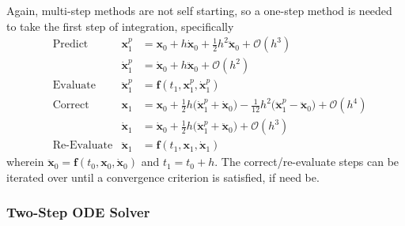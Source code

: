 Again, multi-step methods are not self starting, so a one-step method is needed to take the first step of integration, specifically
\begin{subequations}
    \label{pairedStartUp}
    \begin{align}
    \mbox{} & \text{Predict} & 
    \mathbf{x}_1^p & = \mathbf{x}_0 + h \dot{\mathbf{x}}_0 +
    \tfrac{1}{2} h^2 \ddot{\mathbf{x}}_0 + \mathcal{O} (h^3) 
    \label{startupDisplacementPredictor} \\
    \mbox{} & &
    \dot{\mathbf{x}}^p_1 & = \dot{\mathbf{x}}_0 + h \ddot{\mathbf{x}}_0 + 
    \mathcal{O} (h^2) 
    \label{startUpVelocityPredictor} \\
    \mbox{} & \text{Evaluate} &
    \ddot{\mathbf{x}}^p_1 & = \mathbf{f} (t_1, \mathbf{x}^p_1, \dot{\mathbf{x}}^p_1)
    \label{startUpEvaluate} \\
    \mbox{} & \text{Correct} &
    \mathbf{x}_1 & = \mathbf{x}_0 + \tfrac{1}{2} h 
    \bigl( \dot{\mathbf{x}}^p_1 + \dot{\mathbf{x}}_0 \bigr) -
    \tfrac{1}{12} h^2 \bigl( \ddot{\mathbf{x}}^p_1 - 
    \ddot{\mathbf{x}}_0 \bigr) + \mathcal{O} (h^4) 
    \label{startupDisplacementCorrector} \\
    \mbox{} & &
    \dot{\mathbf{x}}_1 & = \dot{\mathbf{x}}_0 + \tfrac{1}{2} h 
    \bigl( \ddot{\mathbf{x}}_1^p + \ddot{\mathbf{x}}_0 \bigr) + 
    \mathcal{O} (h^3)
    \label{startUpVelocityCorrector} \\
    \mbox{} & \text{Re-Evaluate} &
    \ddot{\mathbf{x}}_1 & = \mathbf{f} (t_1, \mathbf{x}_1, \dot{\mathbf{x}}_1) 
    \label{startUpReEvaluate}
    \end{align}
\end{subequations}
wherein $\ddot{\mathbf{x}}_0 = \mathbf{f}(t_0, \mathbf{x}_0, \dot{\mathbf{x}}_0)$ and $t_1 = t_0 + h$.  The correct\slash re-evaluate steps can be iterated over until a convergence criterion is satisfied, if need be.

\subsubsection{Two-Step ODE Solver}

